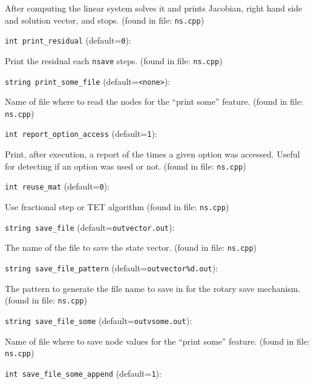 After computing the linear system solves it and prints Jacobian,
right hand side and solution vector, and stops. 
 (found in file: \verb+ns.cpp+)
\item\verb+int print_residual+ {\rm(default=\verb|0|)}:

Print the residual each  \verb+nsave+  steps. 
 (found in file: \verb+ns.cpp+)
\item\verb+string print_some_file+ {\rm(default=\verb|<none>|)}:

Name of file where to read the nodes for the ``print some'' 
feature. 
 (found in file: \verb+ns.cpp+)
\item\verb+int report_option_access+ {\rm(default=\verb|1|)}:

Print, after execution, a report of the times a given option
was accessed. Useful for detecting if an option was used or not.
 (found in file: \verb+ns.cpp+)
\item\verb+int reuse_mat+ {\rm(default=\verb|0|)}:

Use fractional step or TET algorithm
 (found in file: \verb+ns.cpp+)
\item\verb+string save_file+ {\rm(default=\verb|outvector.out|)}:

The name of the file to save the state vector. 
 (found in file: \verb+ns.cpp+)
\item\verb+string save_file_pattern+ {\rm(default=\verb|outvector%d.out|)}:

The pattern to generate the file name to save in for
the rotary save mechanism.
 (found in file: \verb+ns.cpp+)
\item\verb+string save_file_some+ {\rm(default=\verb|outvsome.out|)}:

Name of file where to save node values for the ``print some'' 
feature. 
 (found in file: \verb+ns.cpp+)
\item\verb+int save_file_some_append+ {\rm(default=\verb|1|)}:

